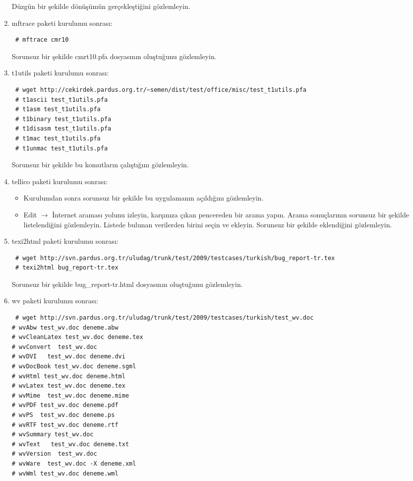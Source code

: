 \documentclass[a4paper,10pt]{article}
\begin{document}
\begin{enumerate}
Düzgün bir şekilde dönüşümün gerçekleştiğini gözlemleyin.
\item mftrace paketi kurulumu sonrası:
\begin{verbatim}
 # mftrace cmr10
\end{verbatim}
Sorunsuz bir şekilde cmrt10.pfa dosyasının oluştuğunu gözlemleyin.
\item t1utils paketi kurulumu sonrası:
\begin{verbatim}
 # wget http://cekirdek.pardus.org.tr/~semen/dist/test/office/misc/test_t1utils.pfa
 # t1ascii test_t1utils.pfa
 # t1asm test_t1utils.pfa
 # t1binary test_t1utils.pfa
 # t1disasm test_t1utils.pfa
 # t1mac test_t1utils.pfa
 # t1unmac test_t1utils.pfa
\end{verbatim}

Sorunsuz bir şekilde bu komutların çalıştığını gözlemleyin. 
\item tellico paketi kurulumu sonrası:


\begin{itemize}
 \item Kurulumdan sonra sorunsuz bir şekilde bu uygulamanın açıldığını gözlemleyin.
 \item Edit $\rightarrow$ İnternet araması yolunu izleyin, karşınıza çıkan pencereden bir arama yapın. Arama sonuçlarının sorunsuz bir şekilde listelendiğini gözlemleyin. Listede bulunan verilerden birini seçin ve ekleyin. Sorunsuz bir şekilde eklendiğini gözlemleyin.
\end{itemize}

\item texi2html paketi kurulumu sonrası:
\begin{verbatim}
 # wget http://svn.pardus.org.tr/uludag/trunk/test/2009/testcases/turkish/bug_report-tr.tex
 # texi2html bug_report-tr.tex
\end{verbatim}

Sorunsuz bir şekilde bug\_report-tr.html dosyasının oluştuğunu gözlemleyin.

\item wv paketi kurulumu sonrası:
\begin{verbatim}
 # wget http://svn.pardus.org.tr/uludag/trunk/test/2009/testcases/turkish/test_wv.doc
# wvAbw test_wv.doc deneme.abw                                
# wvCleanLatex test_wv.doc deneme.tex                            
# wvConvert  test_wv.doc                              
# wvDVI   test_wv.doc deneme.dvi                                
# wvDocBook test_wv.doc deneme.sgml                               
# wvHtml test_wv.doc deneme.html                                 
# wvLatex test_wv.doc deneme.tex                                
# wvMime  test_wv.doc deneme.mime                                
# wvPDF test_wv.doc deneme.pdf                                  
# wvPS  test_wv.doc deneme.ps                                  
# wvRTF test_wv.doc deneme.rtf                                  
# wvSummary test_wv.doc            
# wvText   test_wv.doc deneme.txt                               
# wvVersion  test_wv.doc                             
# wvWare  test_wv.doc -X deneme.xml                                
# wvWml test_wv.doc deneme.wml       


\end{verbatim}
\end{enumerate}
\end{document}
